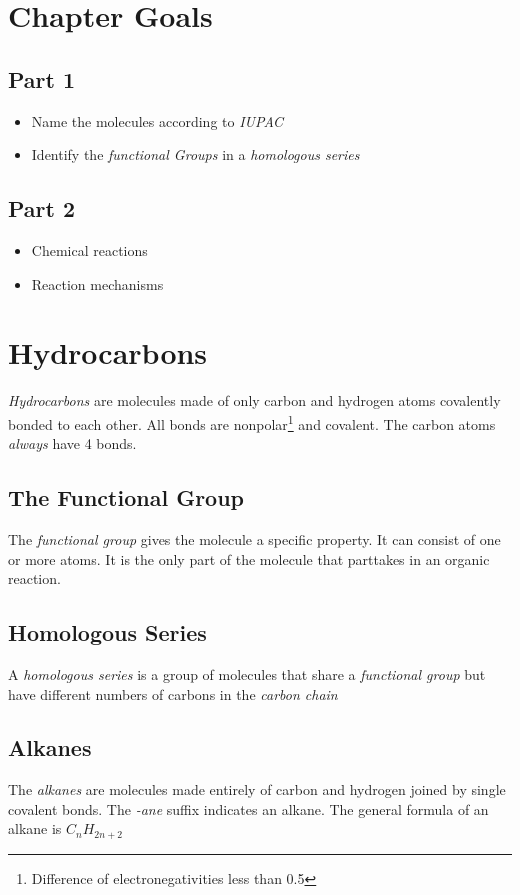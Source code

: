 \documentclass[11pt,twoside]{article}
\begin{document}
	\tableofcontents
	\section{Chapter Goals}
		\subsection{Part 1}
			\begin{itemize}
				\item{Name the molecules according to \emph{IUPAC}}
				\item{Identify the \emph{functional Groups} in a \emph{homologous series}}
			\end{itemize}
		\subsection{Part 2}
			\begin{itemize}
				\item{Chemical reactions}
				\item{Reaction mechanisms}
			\end{itemize}
	\section{Hydrocarbons}
	\emph{Hydrocarbons} are molecules made of only carbon and hydrogen atoms covalently bonded to each other. All bonds are nonpolar\footnote{Difference of electronegativities less than 0.5} and covalent. The carbon atoms \emph{always} have 4 bonds.
		\subsection{The Functional Group}
			The \emph{functional group} gives the molecule a specific property. It can consist of one or more atoms. It is the only part of the molecule that parttakes in an organic reaction.
		\subsection{Homologous Series}
			A \emph{homologous series} is a group of molecules that share a \emph{functional group} but have different numbers of carbons in the \emph{carbon chain}
		\subsection{Alkanes}
			The \emph{alkanes} are molecules made entirely of carbon and hydrogen joined by single covalent bonds. The \emph{-ane} suffix indicates an alkane. The general formula of an alkane is $C_n H_{2n+2}$
\end{document}
